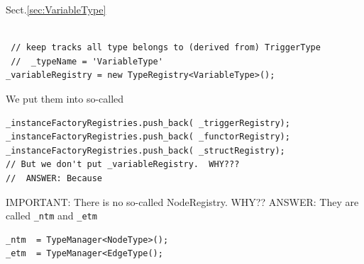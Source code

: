 Sect.\ref{sec:VariableType}
\begin{verbatim}

 // keep tracks all type belongs to (derived from) TriggerType
 //  _typeName = 'VariableType'
_variableRegistry = new TypeRegistry<VariableType>();
\end{verbatim}

We put them into so-called 
\begin{lstlisting}
_instanceFactoryRegistries.push_back( _triggerRegistry);
_instanceFactoryRegistries.push_back( _functorRegistry);
_instanceFactoryRegistries.push_back( _structRegistry);
// But we don't put _variableRegistry.  WHY???
//  ANSWER: Because 
\end{lstlisting}

IMPORTANT: There is no so-called NodeRegistry. WHY?? 
ANSWER: They are called \verb!_ntm! and \verb!_etm!
\begin{lstlisting}
_ntm  = TypeManager<NodeType>();
_etm  = TypeManager<EdgeType();

\end{lstlisting}

